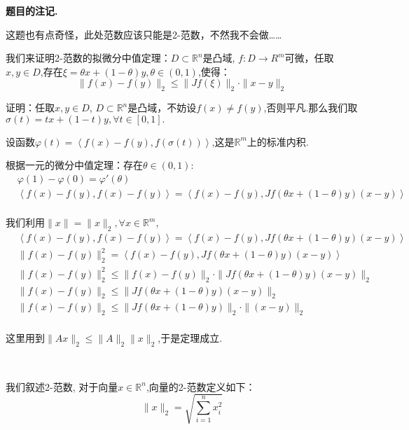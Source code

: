 \documentclass[12pt, a4paper, oneside]{ctexart}
\newcounter{problemname}
\newenvironment{note}{\par\noindent\textbf{题目\arabic{problemname}的注记. }}{\par}
\begin{document}
\begin{note}

    \par
    这题也有点奇怪，此处范数应该只能是2-范数，不然我不会做……
    \par
    我们来证明2-范数的拟微分中值定理：$D\subset \mathbb{R}^n$是凸域, $f:D \to R^m$可微，任取
    $x,y \in D$,存在$\xi=\theta x +(1-\theta)y, \theta\in(0,1)$,使得：
    $$
    \|f(x)-f(y)\|_2\leqslant \|Jf(\xi)\|_2\cdot \|x-y\|_2
    $$
    \par
    证明：任取$x,y \in D$, $D\subset \mathbb{R}^n$是凸域，不妨设$f(x)\neq f(y)$,否则平凡.那么我们取$\sigma(t)=tx+(1-t)y, \forall t\in [0,1].$
    \par
    设函数$\varphi(t)=\left \langle f(x)-f(y), f(\sigma(t))\right \rangle$,这是$\mathbb{R}^m$上的标准内积.
    \par
    根据一元的微分中值定理：存在$\theta \in(0,1)$:
    $$
    \begin{aligned}
    &\varphi(1)-\varphi(0)=\varphi'(\theta)\\
    &\left \langle f(x)-f(y), f(x)-f(y) \right \rangle=\left \langle f(x)-f(y), Jf(\theta x+(1-\theta)y)(x-y)\right \rangle\\
    \end{aligned}
    $$
    \par
    我们利用$\|x\|=\|x\|_2, \forall x \in \mathbb{R}^m$,
    $$
    \begin{aligned}
    &\left \langle f(x)-f(y), f(x)-f(y) \right \rangle=\left \langle f(x)-f(y), Jf(\theta x+(1-\theta)y)(x-y)\right \rangle\\
    &\|f(x)-f(y)\|_2^2    =\left \langle f(x)-f(y), Jf(\theta x+(1-\theta)y)(x-y)\right \rangle\\
    &\|f(x)-f(y)\|_2^2    \leqslant \|f(x)-f(y)\|_2\cdot\| Jf(\theta x+(1-\theta)y)(x-y)\|_2\\
    &\|f(x)-f(y)\|_2   \leqslant \| Jf(\theta x+(1-\theta)y)(x-y)\|_2\\
    &\|f(x)-f(y)\|_2   \leqslant  \| Jf(\theta x+(1-\theta)y)\|_2\cdot\|(x-y)\|_2\\
\end{aligned}
    $$
    \par
    这里用到$\|Ax\|_2\leqslant \|A\|_2\|x\|_2$,于是定理成立.
    \par
    \quad\\
    \par
    我们叙述2-范数, 对于向量$x\in \mathbb{R}^n$,向量的2-范数定义如下：
    $$
    \|x\|_2=\sqrt{\sum_{i=1}^{n}x_i^2}
$$
\end{note}
\end{document}
